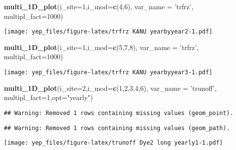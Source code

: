 \documentclass[]{article}
\newenvironment{Shaded}{\begin{snugshade}}{\end{snugshade}}
\newcommand{\DataTypeTok}[1]{\textcolor[rgb]{0.13,0.29,0.53}{#1}}
\newcommand{\DecValTok}[1]{\textcolor[rgb]{0.00,0.00,0.81}{#1}}
\newcommand{\KeywordTok}[1]{\textcolor[rgb]{0.13,0.29,0.53}{\textbf{#1}}}
\newcommand{\NormalTok}[1]{#1}
\newcommand{\StringTok}[1]{\textcolor[rgb]{0.31,0.60,0.02}{#1}}
\begin{document}
\begin{Shaded}
\begin{Highlighting}[]
\KeywordTok{multi_1D_plot}\NormalTok{(}\DataTypeTok{i_site=}\DecValTok{1}\NormalTok{,}\DataTypeTok{i_mod=}\KeywordTok{c}\NormalTok{(}\DecValTok{4}\NormalTok{,}\DecValTok{6}\NormalTok{), }\DataTypeTok{var_name =} \StringTok{'trfrz'}\NormalTok{,  }\DataTypeTok{multipl_fact=}\DecValTok{1000}\NormalTok{)  }
\end{Highlighting}
\end{Shaded}

\texttt{[image: yep\_files/figure-latex/trfrz KANU yearbyyear2-1.pdf]}

\begin{Shaded}
\begin{Highlighting}[]
\KeywordTok{multi_1D_plot}\NormalTok{(}\DataTypeTok{i_site=}\DecValTok{1}\NormalTok{,}\DataTypeTok{i_mod=}\KeywordTok{c}\NormalTok{(}\DecValTok{5}\NormalTok{,}\DecValTok{7}\NormalTok{,}\DecValTok{8}\NormalTok{), }\DataTypeTok{var_name =} \StringTok{'trfrz'}\NormalTok{,  }\DataTypeTok{multipl_fact=}\DecValTok{1000}\NormalTok{)  }
\end{Highlighting}
\end{Shaded}

\texttt{[image: yep\_files/figure-latex/trfrz KANU yearbyyear3-1.pdf]}

\begin{Shaded}
\begin{Highlighting}[]
\KeywordTok{multi_1D_plot}\NormalTok{(}\DataTypeTok{i_site=}\DecValTok{2}\NormalTok{,}\DataTypeTok{i_mod=}\KeywordTok{c}\NormalTok{(}\DecValTok{1}\NormalTok{,}\DecValTok{2}\NormalTok{,}\DecValTok{3}\NormalTok{,}\DecValTok{4}\NormalTok{,}\DecValTok{6}\NormalTok{), }\DataTypeTok{var_name =} \StringTok{'trunoff'}\NormalTok{,  }\DataTypeTok{multipl_fact=}\DecValTok{1}\NormalTok{,}\DataTypeTok{opt=}\StringTok{"yearly"}\NormalTok{)  }
\end{Highlighting}
\end{Shaded}

\begin{verbatim}
## Warning: Removed 1 rows containing missing values (geom_point).
\end{verbatim}

\begin{verbatim}
## Warning: Removed 1 rows containing missing values (geom_path).
\end{verbatim}

\texttt{[image: yep\_files/figure-latex/trunoff Dye2 long yearly1-1.pdf]}
\end{document}
